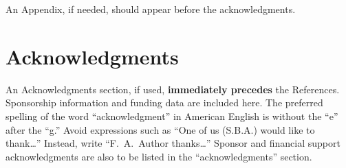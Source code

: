 \documentclass[conf]{new-aiaa}
\begin{document}
An Appendix, if needed, should appear before the acknowledgments.

\section*{Acknowledgments}
An Acknowledgments section, if used, \textbf{immediately precedes} the References. Sponsorship information and funding data are included here. The preferred spelling of the word ``acknowledgment'' in American English is without the ``e'' after the ``g.'' Avoid expressions such as ``One of us (S.B.A.) would like to thank\ldots'' Instead, write ``F.~A.~Author thanks\ldots'' Sponsor and financial support acknowledgments are also to be listed in the ``acknowledgments'' section.


\end{document}
